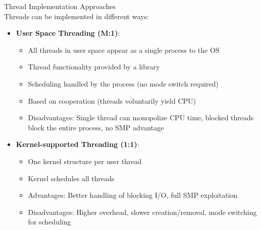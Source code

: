 \begin{concept}{Thread Implementation Approaches}\\
    Threads can be implemented in different ways:
    \begin{itemize}
        \item \textbf{User Space Threading (M:1)}:
            \begin{itemize}
                \item All threads in user space appear as a single process to the OS
                \item Thread functionality provided by a library
                \item Scheduling handled by the process (no mode switch required)
                \item Based on cooperation (threads voluntarily yield CPU)
                \item Disadvantages: Single thread can monopolize CPU time, blocked threads block the entire process, no SMP advantage
            \end{itemize}
        \item \textbf{Kernel-supported Threading (1:1)}:
            \begin{itemize}
                \item One kernel structure per user thread
                \item Kernel schedules all threads
                \item Advantages: Better handling of blocking I/O, full SMP exploitation
                \item Disadvantages: Higher overhead, slower creation/removal, mode switching for scheduling
            \end{itemize}
    \end{itemize}
\end{concept}



